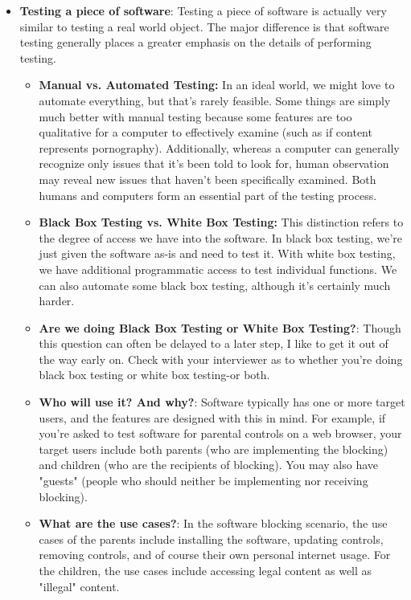 \documentclass{report}
\begin{document}
\begin{itemize}
\begin{itemize}
            \end{itemize}
        \item \textbf{Testing a piece of software}: Testing a piece of software is actually very similar to testing a real world object. The major difference is that software testing generally places a greater emphasis on the details of performing testing.
            \begin{itemize}
                \item \textbf{Manual vs. Automated Testing:} In an ideal world, we might love to automate everything, but that's rarely feasible. Some things are simply much better with manual testing because some features are too qualitative for a computer to effectively examine (such as if content represents pornography). Additionally, whereas a computer can generally recognize only issues that it's been told to look for, human observation may reveal new issues that haven't been specifically examined. Both humans and computers form an essential part of the testing process.
                \item \textbf{Black Box Testing vs. White Box Testing:} This distinction refers to the degree of access we have into the software. In black box testing, we're just given the software as-is and need to test it. With white box testing, we have additional programmatic access to test individual functions. We can also automate some black box testing, although it's certainly much harder.
            \end{itemize}
            \begin{itemize}
                \item \textbf{Are we doing Black Box Testing or White Box Testing?}: Though this question can often be delayed to a later step, I like to get it out of the way early on. Check with your interviewer as to whether you're doing black box testing or white box testing-or both.
                \item \textbf{Who will use it? And why?}: Software typically has one or more target users, and the features are designed with this in mind. For example, if you're asked to test software for parental controls on a web browser, your target users include both parents (who are implementing the blocking) and children (who are the recipients of blocking). You may also have "guests" (people who should neither be implementing nor receiving blocking).
                \item \textbf{What are the use cases?}: In the software blocking scenario, the use cases of the parents include installing the software, updating controls, removing controls, and of course their own personal internet usage. For the children, the use cases include accessing legal content as well as "illegal" content.

\end{itemize}
\end{itemize}
\end{document}
